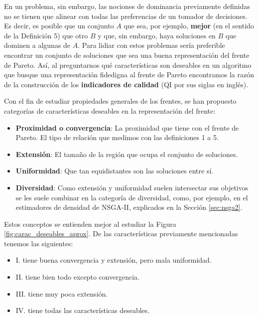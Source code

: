 En un problema, sin embargo, las nociones de dominancia previamente definidas no se tienen que alinear con todas las preferencias de un tomador de decisiones. Es decir, es posible que un conjunto $A$ que sea, por ejemplo, \textbf{mejor} (en el sentido de la Definición 5) que otro $B$ y que, sin embargo, haya soluciones en $B$ que dominen a algunas de $A$. Para lidiar con estos problemas sería preferible encontrar un conjunto de soluciones que sea una buena representación del frente de Pareto. Así, al preguntarnos qué características son deseables en un algoritmo que busque una representación fidedigna al frente de Pareto encontramos la razón de la construcción de los  \textbf{indicadores de calidad} (QI por sus siglas en inglés).


Con el fin de estudiar propiedades generales de los frentes, se han propuesto categorías de características deseables en la representación del frente:

\begin{itemize}
    \item \textbf{Proximidad o convergencia}: La proximidad que tiene con el frente de Pareto. El tipo de relación que medimos con las definiciones 1 a 5. 
    \item \textbf{Extensión}:  El tamaño de la región que ocupa el conjunto de soluciones. 
    \item \textbf{Uniformidad}: Que tan equidistantes son las soluciones entre sí.
    \item \textbf{Diversidad}: Como extensión y uniformidad suelen intersectar sus objetivos se les suele combinar en la categoría de diversidad, como, por ejemplo, en el estimadores de densidad de NSGA-II, explicados en la Sección \ref{sec:nsga2}. 
\end{itemize}

Estos conceptos se  entienden mejor al estudiar la Figura \ref{fig:carac_deseables_aprox}. De las características previamente mencionadas tenemos las siguientes: 

\begin{itemize}
    \item I. tiene buena convergencia y extensión, pero mala uniformidad.
    \item II. tiene bien todo excepto convergencia.
    \item III. tiene muy poca extensión.
    \item IV. tiene todas las características deseables.
\end{itemize}

